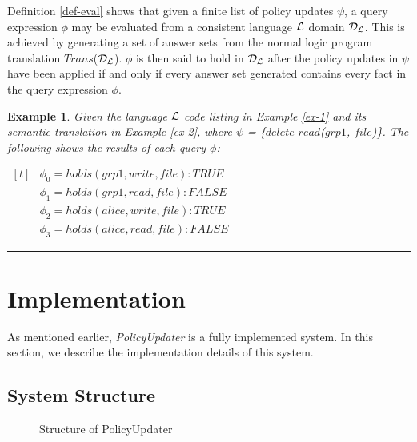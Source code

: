 \documentclass[11pt, twocolumn]{article}
\newtheorem{vexmpl}{Example}
\newenvironment{vexample}
  {\begin{vexmpl}\rm}
  {\rule{2mm}{2mm}\end{vexmpl}}
\newenvironment{vquote}
  {\begin{list}{}{\leftmargin 1em}\item[]}
  {\end{list}}
\begin{document}
    Definition \ref{def-eval} shows that given a finite list of policy updates
    $\psi$, a query expression $\phi$ may be evaluated from a consistent
    language ${\cal L}$ domain ${\cal D_{L}}$. This is achieved by generating a
    set of answer sets from the normal logic program translation
    $Trans$(${\cal D_{L}}$). $\phi$ is then said to hold in ${\cal D_{L}}$
    after the policy updates in $\psi$ have been applied if and only if every
    answer set generated contains every fact in the query expression $\phi$.

    \begin{vexample}
      \label{ex-3}
      Given the language ${\cal L}$ code listing in Example \ref{ex-1} and its
      semantic translation in Example \ref{ex-2}, where $\psi$ =
      \{$delete\_read$($grp1$, $file$)\}. The following shows the
      results of each query $\phi$:

      \begin{vquote}
        \begin{math}
          \begin{aligned}[t]
            &\phi_{0} = holds(grp1, write, file) : TRUE \\
            &\phi_{1} = holds(grp1, read, file) : FALSE \\
            &\phi_{2} = holds(alice, write, file) : TRUE \\
            &\phi_{3} = holds(alice, read, file) : FALSE
          \end{aligned}
        \end{math}
      \end{vquote}
    \end{vexample}

  \section{Implementation}
    \label{sec-implement}

    As mentioned earlier, {\em PolicyUpdater} is a fully implemented system.
    In this section, we describe the implementation details of this system.

    \subsection{System Structure}

    \begin{figure}[ht]
      \begin{center}
        \caption{Structure of PolicyUpdater}
        \label{fig-1}
      \end{center}
    \end{figure}
\end{document}
